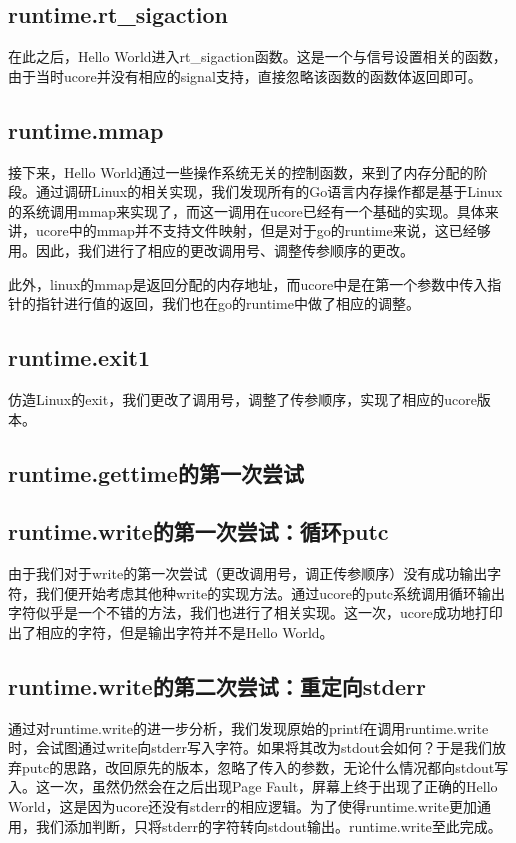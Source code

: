 \documentclass{article}
\begin{document}
\subsection{runtime.rt\_sigaction}
在此之后，Hello World进入rt\_sigaction函数。这是一个与信号设置相关的函数，由于当时ucore并没有相应的signal支持，直接忽略该函数的函数体返回即可。

\subsection{runtime.mmap}
接下来，Hello World通过一些操作系统无关的控制函数，来到了内存分配的阶段。通过调研Linux的相关实现，我们发现所有的Go语言内存操作都是基于Linux的系统调用mmap来实现了，而这一调用在ucore已经有一个基础的实现。具体来讲，ucore中的mmap并不支持文件映射，但是对于go的runtime来说，这已经够用。因此，我们进行了相应的更改调用号、调整传参顺序的更改。

此外，linux的mmap是返回分配的内存地址，而ucore中是在第一个参数中传入指针的指针进行值的返回，我们也在go的runtime中做了相应的调整。

\subsection{runtime.exit1}
仿造Linux的exit，我们更改了调用号，调整了传参顺序，实现了相应的ucore版本。

\subsection{runtime.gettime的第一次尝试}

\subsection{runtime.write的第一次尝试：循环putc}
由于我们对于write的第一次尝试（更改调用号，调正传参顺序）没有成功输出字符，我们便开始考虑其他种write的实现方法。通过ucore的putc系统调用循环输出字符似乎是一个不错的方法，我们也进行了相关实现。这一次，ucore成功地打印出了相应的字符，但是输出字符并不是Hello World。

\subsection{runtime.write的第二次尝试：重定向stderr}
通过对runtime.write的进一步分析，我们发现原始的printf在调用runtime.write时，会试图通过write向stderr写入字符。如果将其改为stdout会如何？于是我们放弃putc的思路，改回原先的版本，忽略了传入的参数，无论什么情况都向stdout写入。这一次，虽然仍然会在之后出现Page Fault，屏幕上终于出现了正确的Hello World，这是因为ucore还没有stderr的相应逻辑。为了使得runtime.write更加通用，我们添加判断，只将stderr的字符转向stdout输出。runtime.write至此完成。
\end{document}
